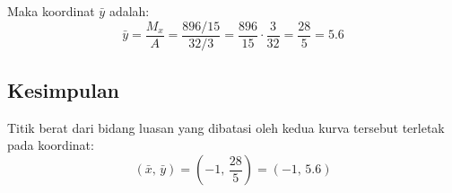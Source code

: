 \documentclass[12pt,a4paper]{article}
\begin{document}
Maka koordinat $\bar{y}$ adalah:
\[
  \bar{y} = \frac{M_x}{A} = \frac{896/15}{32/3} = \frac{896}{15} \cdot \frac{3}{32} = \frac{28}{5} = 5.6
\]

\subsection*{Kesimpulan}
Titik berat dari bidang luasan yang dibatasi oleh kedua kurva tersebut terletak pada koordinat:
\[
  (\bar{x}, \, \bar{y}) = \left(-1, \, \frac{28}{5}\right) = (-1, \, 5.6)
\]
\end{document}
